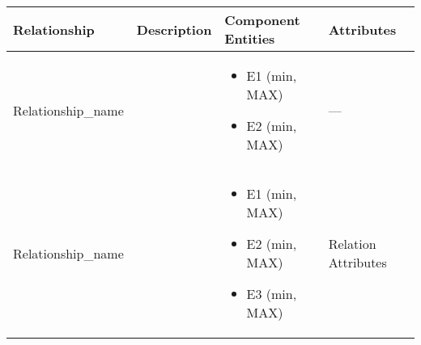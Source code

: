 \begin{longtable}{|p{}|p{} |p{}|p{} |} 
\hline
\textbf{Relationship} & \textbf{Description} & \textbf{Component Entities} & \textbf{Attributes} \\\hline


Relationship\_name & & \begin{itemize}
        \vspace{-1em}
        \item E1 (min, MAX)
        \item E2 (min, MAX)
    \end{itemize}
 &  --- \\\hline
 
 Relationship\_name & & \begin{itemize}
        \vspace{-1em}
        \item E1 (min, MAX)
        \item E2 (min, MAX)
        \item E3 (min, MAX)
    \end{itemize}
 &  Relation Attributes \\\hline

\end{longtable}